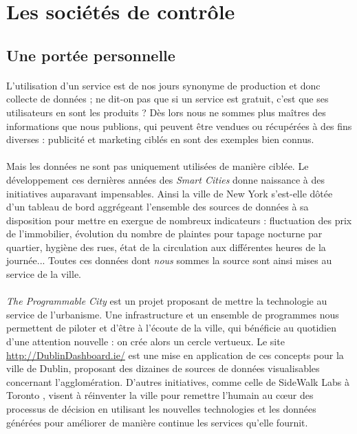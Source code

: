 \section{Les sociétés de contrôle}

\subsection*{Une portée personnelle}

\paragraph{} L'utilisation d'un service est de nos jours synonyme de production et donc collecte de données ; ne dit-on
pas que si un service est gratuit, c'est que ses utilisateurs en sont les produits ? Dès lors nous ne sommes plus maîtres
des informations que nous publions, qui peuvent être vendues ou récupérées à des fins diverses : publicité et marketing
ciblés en sont des exemples bien connus.

\paragraph{} Mais les données ne sont pas uniquement utilisées de manière ciblée. Le développement ces dernières années 
des \emph{Smart Cities} donne naissance à des initiatives auparavant impensables. Ainsi la ville de New York s'est-elle
dôtée d'un tableau de bord \cite{ProgrammableCity1} aggrégeant l'ensemble des sources de données à sa disposition pour 
mettre en exergue de nombreux indicateurs : fluctuation des prix de l'immobilier, évolution du nombre de plaintes pour 
tapage nocturne par quartier, hygiène des rues, état de la circulation aux différentes heures de la journée...
Toutes ces données dont \emph{nous} sommes la source sont ainsi mises au service de la ville.

\paragraph{} \emph{The Programmable City} \cite{ProgrammableCity0} est un projet proposant de mettre la technologie au
service de l'urbanisme. Une infrastructure et un ensemble de programmes nous permettent de piloter et d'être à l'écoute
de la ville, qui bénéficie au quotidien d'une attention nouvelle : on crée alors un cercle vertueux. Le site
\url{http://DublinDashboard.ie/} est une mise en application de ces concepts pour la ville de Dublin, proposant des
dizaines de sources de données visualisables concernant l'agglomération. D'autres initiatives, comme celle de SideWalk Labs
à Toronto \cite{ProgrammableCity3}, visent à réinventer la ville pour remettre l'humain au c\oe{}ur des processus de
décision en utilisant les nouvelles technologies et les données générées pour améliorer de manière continue les services
qu'elle fournit.

